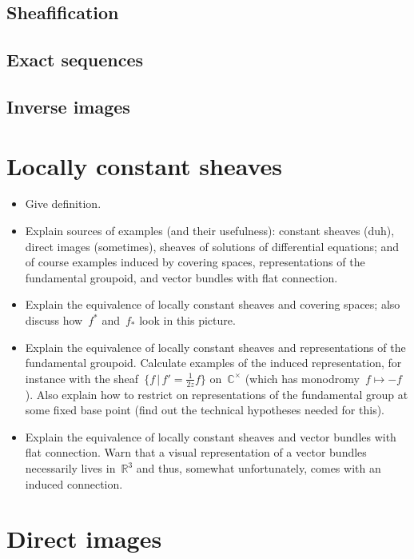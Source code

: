 \documentclass[10pt]{amsart}
\theoremstyle{definition}
\theoremstyle{plain}
\theoremstyle{remark}
\begin{document}
\subsection{Sheafification}

\subsection{Exact sequences}

\subsection{Inverse images}




\section{Locally constant sheaves}

\begin{itemize}
\item Give definition.
\item Explain sources of examples (and their usefulness): constant sheaves
(duh), direct images (sometimes), sheaves of solutions of differential
equations; and of course examples induced by covering spaces, representations
of the fundamental groupoid, and vector bundles with flat connection.
\item Explain the equivalence of locally constant sheaves and covering spaces;
also discuss how~$f^*$ and~$f_*$ look in this picture.
\item Explain the equivalence of locally constant sheaves and representations
of the fundamental groupoid. Calculate examples of the induced representation,
for instance with the sheaf~$\{ f \,|\, f' = \frac{1}{2z} f \}$
on~$\mathbb{C}^\times$ (which has monodromy~$f \mapsto -f$). Also explain how
to restrict on representations of the fundamental group at some fixed base
point (find out the technical hypotheses needed for this).
\item Explain the equivalence of locally constant sheaves and vector bundles
with flat connection. Warn that a visual representation of a vector bundles
necessarily lives in~$\mathbb{R}^3$ and thus, somewhat unfortunately, comes
with an induced connection.
\end{itemize}


\section{Direct images}
\end{document}
